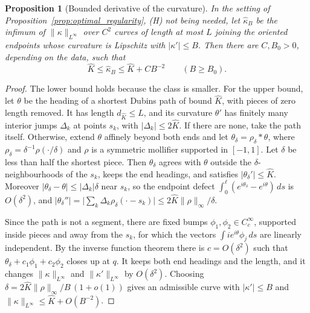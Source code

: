 \documentclass[11pt,reqno]{amsart}
\newtheorem{proposition}[theorem]{Proposition}
\theoremstyle{definition}
\numberwithin{equation}{section}
\begin{document}
\begin{proposition}[Bounded derivative of the curvature]
\label{prop:bounded_derivative_rate}
In the setting of Proposition~\ref{prop:optimal_regularity}, (H) not being needed, let $\hat\kappa_B$ be the infimum of $\|\kappa\|_{L^\infty}$ over $C^2$ curves of length at most $L$ joining the oriented endpoints whose curvature is Lipschitz with $|\kappa'| \le B$. Then there are $C, B_0 > 0$, depending on the data, such that
\begin{equation}
\hat K \le \hat\kappa_B \le \hat K + C B^{-2} \qquad (B \ge B_0).
\end{equation}
\end{proposition}

\begin{proof}
The lower bound holds because the class is smaller. For the upper bound, let $\theta$ be the heading of a shortest Dubins path of bound $\hat K$, with pieces of zero length removed. It has length $d_{\hat K} \le L$, and its curvature $\theta'$ has finitely many interior jumps $\Delta_k$ at points $s_k$, with $|\Delta_k| \le 2\hat K$. If there are none, take the path itself. Otherwise, extend $\theta$ affinely beyond both ends and let $\theta_\delta = \rho_\delta * \theta$, where $\rho_\delta = \delta^{-1}\rho(\cdot/\delta)$ and $\rho$ is a symmetric mollifier supported in $[-1,1]$. Let $\delta$ be less than half the shortest piece. Then $\theta_\delta$ agrees with $\theta$ outside the $\delta$-neighbourhoods of the $s_k$, keeps the end headings, and satisfies $|\theta_\delta'| \le \hat K$. Moreover $|\theta_\delta - \theta| \le |\Delta_k|\delta$ near $s_k$, so the endpoint defect $\int_0^{\ell} (e^{i\theta_\delta} - e^{i\theta})\,ds$ is $O(\delta^2)$, and $|\theta_\delta''| = \big|\sum_k \Delta_k\rho_\delta(\cdot - s_k)\big| \le 2\hat K\|\rho\|_\infty/\delta$.

Since the path is not a segment, there are fixed bumps $\phi_1, \phi_2 \in C_c^\infty$, supported inside pieces and away from the $s_k$, for which the vectors $\int i e^{i\theta}\phi_j\,ds$ are linearly independent. By the inverse function theorem there is $c = O(\delta^2)$ such that $\theta_\delta + c_1\phi_1 + c_2\phi_2$ closes up at $q$. It keeps both end headings and the length, and it changes $\|\kappa\|_{L^\infty}$ and $\|\kappa'\|_{L^\infty}$ by $O(\delta^2)$. Choosing $\delta = 2\hat K\|\rho\|_\infty/B\,(1 + o(1))$ gives an admissible curve with $|\kappa'| \le B$ and $\|\kappa\|_{L^\infty} \le \hat K + O(B^{-2})$.
\end{proof}
\end{document}
